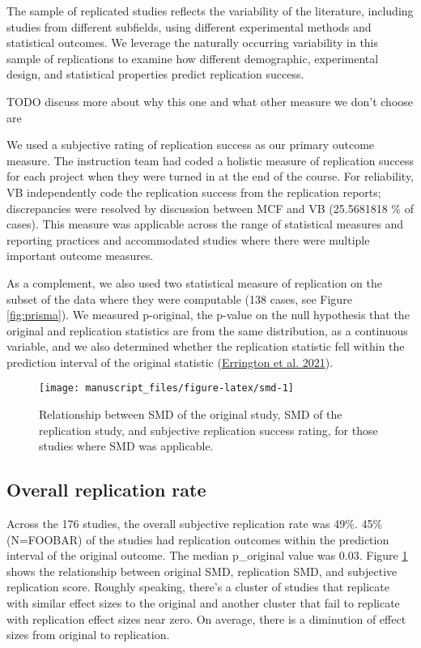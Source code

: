 \documentclass[
  english,
  a4paper,
]{article}
\begin{document}
The sample of replicated studies reflects the variability of the literature, including studies from different subfields, using different experimental methods and statistical outcomes. We leverage the naturally occurring variability in this sample of replications to examine how different demographic, experimental design, and statistical properties predict replication success.

TODO discuss more about why this one and what other measure we don't choose are

We used a subjective rating of replication success as our primary outcome measure. The instruction team had coded a holistic measure of replication success for each project when they were turned in at the end of the course. For reliability, VB independently code the replication success from the replication reports; discrepancies were resolved by discussion between MCF and VB (25.5681818 \% of cases). This measure was applicable across the range of statistical measures and reporting practices and accommodated studies where there were multiple important outcome measures.

As a complement, we also used two statistical measure of replication on the subset of the data where they were computable (138 cases, see Figure \ref{fig:prisma}). We measured p-original, the p-value on the null hypothesis that the original and replication statistics are from the same distribution, as a continuous variable, and we also determined whether the replication statistic fell within the prediction interval of the original statistic (\protect\hyperlink{ref-errington2021}{Errington et al. 2021}).

\begin{figure}[ht]
\texttt{[image: manuscript\_files/figure-latex/smd-1]} \caption{Relationship between SMD of the original study, SMD of the replication study, and subjective replication success rating, for those studies where SMD was applicable.}\label{fig:smd}
\end{figure}

\hypertarget{overall-replication-rate}{%
\subsection{Overall replication rate}\label{overall-replication-rate}}

Across the 176 studies, the overall subjective replication rate was 49\%. 45\% (N=FOOBAR) of the studies had replication outcomes within the prediction interval of the original outcome. The median p\_original value was 0.03. Figure \ref{fig:smd} shows the relationship between original SMD, replication SMD, and subjective replication score. Roughly speaking, there's a cluster of studies that replicate with similar effect sizes to the original and another cluster that fail to replicate with replication effect sizes near zero. On average, there is a diminution of effect sizes from original to replication.
\end{document}
